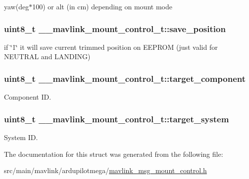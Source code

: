 yaw(deg$\ast$100) or alt (in cm) depending on mount mode 

\hypertarget{struct____mavlink__mount__control__t_ad1e40c626c85249aef8d74cd80382151}{
\subsubsection[{save\+\_\+position}]{\setlength{\rightskip}{0pt plus 5cm}uint8\+\_\+t \+\_\+\+\_\+mavlink\+\_\+mount\+\_\+control\+\_\+t\+::save\+\_\+position}}\label{struct____mavlink__mount__control__t_ad1e40c626c85249aef8d74cd80382151}


if \char`\"{}1\char`\"{} it will save current trimmed position on E\+E\+P\+R\+O\+M (just valid for N\+E\+U\+T\+R\+A\+L and L\+A\+N\+D\+I\+N\+G) 

\hypertarget{struct____mavlink__mount__control__t_a7a6d068093efc260b10c484b6c323f9a}{
\subsubsection[{target\+\_\+component}]{\setlength{\rightskip}{0pt plus 5cm}uint8\+\_\+t \+\_\+\+\_\+mavlink\+\_\+mount\+\_\+control\+\_\+t\+::target\+\_\+component}}\label{struct____mavlink__mount__control__t_a7a6d068093efc260b10c484b6c323f9a}


Component I\+D. 

\hypertarget{struct____mavlink__mount__control__t_a177fc01352e7aabd7f897cd2d9fcb60d}{
\subsubsection[{target\+\_\+system}]{\setlength{\rightskip}{0pt plus 5cm}uint8\+\_\+t \+\_\+\+\_\+mavlink\+\_\+mount\+\_\+control\+\_\+t\+::target\+\_\+system}}\label{struct____mavlink__mount__control__t_a177fc01352e7aabd7f897cd2d9fcb60d}


System I\+D. 



The documentation for this struct was generated from the following file\+:\begin{DoxyCompactItemize}
\item 
src/main/mavlink/ardupilotmega/\hyperlink{mavlink__msg__mount__control_8h}{mavlink\+\_\+msg\+\_\+mount\+\_\+control.\+h}\end{DoxyCompactItemize}
